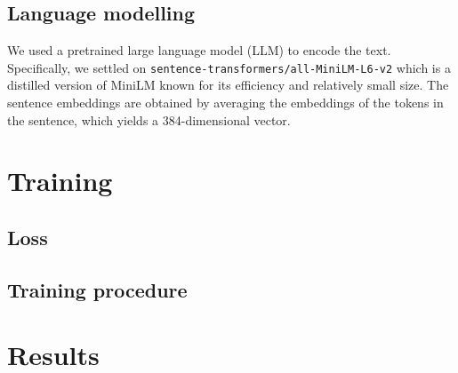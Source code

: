 \documentclass[switch, 12pt]{article}
\begin{document}
\begin{multicols}{2}
    \cite{ying-2018}

    \subsection{Language modelling}

    We used a pretrained large language model (LLM) to encode the text. Specifically, we settled on \texttt{sentence-transformers/all-MiniLM-L6-v2} which is a distilled version of MiniLM \cite{wang-2020} known for its efficiency and relatively small size. The sentence embeddings are obtained by averaging the embeddings of the tokens in the sentence, which yields a 384-dimensional vector.

    \section{Training}

    \subsection{Loss}

    \subsection{Training procedure}

    \section{Results}

    \newpage

    

\end{multicols}
\end{document}
